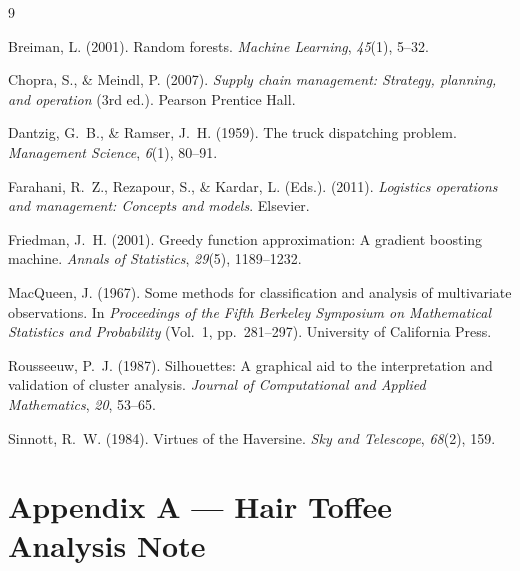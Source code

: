 \documentclass[12pt, a4paper]{article}
\begin{document}

\begin{thebibliography}{9}

Breiman, L. (2001).
Random forests.
\textit{Machine Learning}, \textit{45}(1), 5--32.

Chopra, S., \& Meindl, P. (2007).
\textit{Supply chain management: Strategy, planning, and operation}
(3rd ed.). Pearson Prentice Hall.

Dantzig, G.~B., \& Ramser, J.~H. (1959).
The truck dispatching problem.
\textit{Management Science}, \textit{6}(1), 80--91.

Farahani, R.~Z., Rezapour, S., \& Kardar, L. (Eds.). (2011).
\textit{Logistics operations and management: Concepts and models}.
Elsevier.

Friedman, J.~H. (2001).
Greedy function approximation: A gradient boosting machine.
\textit{Annals of Statistics}, \textit{29}(5), 1189--1232.

MacQueen, J. (1967).
Some methods for classification and analysis of multivariate
observations.
In \textit{Proceedings of the Fifth Berkeley Symposium on
Mathematical Statistics and Probability} (Vol.~1, pp.~281--297).
University of California Press.

Rousseeuw, P.~J. (1987).
Silhouettes: A graphical aid to the interpretation and validation
of cluster analysis.
\textit{Journal of Computational and Applied Mathematics},
\textit{20}, 53--65.

Sinnott, R.~W. (1984).
Virtues of the Haversine.
\textit{Sky and Telescope}, \textit{68}(2), 159.

\end{thebibliography}

\newpage
\appendix

\section*{Appendix A --- Hair Toffee Analysis Note}
\end{document}
